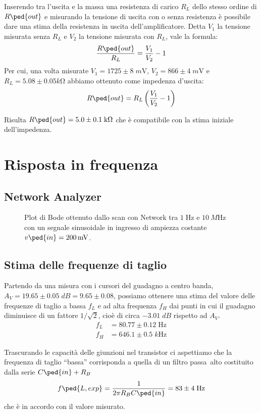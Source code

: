 \documentclass[10pt,a4paper]{article}
\begin{document}
Inserendo tra l'uscita e la massa una resistenza di carico $R_L$ dello stesso
ordine di $R\ped{out}$ e misurando la tensione di uscita con o senza
resistenza è possibile dare una stima della resistenza in uscita
dell'amplificatore.
Detta $V_1$ la tensione misurata senza $R_L$ e $V_2$ la tensione misurata
con $R_L$, vale la formula:
\begin{equation}\label{eq: Zout}
\frac{R\ped{out}}{R_L} = \frac{V_1}{V_2} -1
\end{equation}
Per cui, una volta misurate $V_1 = 1725 \pm 8 \; \si{m\V}$,
$V_2 = 866 \pm 4\; \si{m\V}$ e $R_L = 5.08 \pm 0.05 \si{k\ohm}$ abbiamo ottenuto come impedenza d'uscita:
\[
R\ped{out} = R_L \left(\frac{V_1}{V_2} - 1\right)
\]

Risulta $R\ped{out} = 5.0 \pm 0.1\; \si{k\ohm}$ che è compatibile con la stima iniziale dell'impedenza.
\section{Risposta in frequenza}

\subsection{Network Analyzer}
\begin{figure}[htb]
\centering
\caption{Plot di Bode ottenuto dallo scan con Network tra $1 \; \si{\Hz}$ e
$\SI{10}{M\Hz}$ con un segnale sinusoidale in ingresso di ampiezza costante
$v\ped{in} = \SI{200}{m\V}$. \label{fig: bodeplot}}
\end{figure}

\subsection{Stima delle frequenze di taglio}
Partendo da una misura con i cursori del guadagno a centro banda,
$A_V = 19.65 \pm 0.05 \; \si{dB} = 9.65 \pm 0.08$, possiamo ottenere una stima del valore
delle frequenze di taglio a bassa $f_L$ e ad alta frequenza $f_H$ dai punti
in cui il guadagno diminuisce di un fattore $1/\sqrt{2}$, cioè di circa
$-3.01 \; \si{dB}$ rispetto ad $A_V$.
\begin{align*}
f_L &= 80.77 \pm 0.12 \; \si{\Hz}\\
f_H &= 646.1 \pm 0.5 \; \si{k\Hz}
\end{align*}

Trascurando le capacità delle giunzioni nel transistor ci aspettiamo che
la frequenza di taglio ``bassa'' corrisponda a quella di un filtro passa~alto
costituito dalla serie $C\ped{in} + R_B$
\begin{equation}
f\ped{L, exp} = \frac{1}{2\pi R_B C\ped{in}} = 83 \pm 4 \; \si{\Hz}
\end{equation} 
che è in accordo con il valore misurato.
\end{document}
